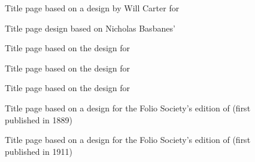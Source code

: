 \documentclass[10pt,letterpaper,extrafontsizes]{memoir}
\begin{document}
\begin{figure}
\centering
\begin{showtitle}
\titleAM
\end{showtitle}
\caption{Title page based on a design by Will Carter for
} \label{fig:titleAM}
\end{figure}


\begin{figure}
\centering
\begin{showtitle}
\titlePM
\end{showtitle}
\caption{Title page design based on Nicholas Basbanes' } \label{fig:titlePM}
\end{figure}


\begin{figure}
\centering
\begin{showtitle}
\titleAT
\end{showtitle}
\caption{Title page based on the design for } \label{fig:titleAT}
\end{figure}


\begin{figure}
\centering
\begin{showtitle}
\titleLL
\end{showtitle}
\caption{Title page based on the design for } \label{fig:titleLL}
\end{figure}


\begin{figure}
\centering
\begin{showtitle}
\titleSW
\end{showtitle}
\caption{Title page based on the design for } \label{fig:titleSW}
\end{figure}


\begin{figure}
\centering
\begin{showtitle}
\titleTMB
\end{showtitle}
\caption{Title page based on a design for the Folio Society's edition of
   (first published in 1889)} \label{fig:titleTMB}
\end{figure}


\begin{figure}
\centering
\begin{showtitle}
\titleZD
\end{showtitle}
\caption{Title page based on a design for the Folio Society's edition of
   (first published in 1911)} \label{fig:titleZD}
\end{figure}
\end{document}
